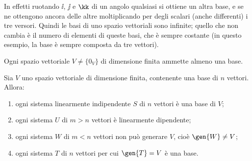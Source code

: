 In effetti ruotando $\ii$, $\jj$ e $\kk$ di un angolo qualsiasi si ottiene un altra base, e se ne ottengono ancora delle altre moltiplicando per degli scalari (anche differenti) i tre versori.
Quindi le basi di uno spazio vettoriali sono infinite; quello che non cambia è il numero di elementi di queste basi, che è sempre costante (in questo esempio, la base è sempre composta da tre vettori).
\begin{corollario}
	Ogni spazio vettoriale $V\neq\{0_V\}$ di dimensione finita ammette almeno una base.
\end{corollario}
\begin{teorema} \label{t:base-dimensione}
	Sia $V$ uno spazio vettoriale di dimensione finita, contenente una base di $n$ vettori.
	Allora:
	\begin{enumerate}
		\item ogni sistema linearmente indipendente $S$ di $n$ vettori è una base di $V$;
		\item ogni sistema $U$ di $m>n$ vettori è linearmente dipendente;
		\item ogni sistema $W$ di $m<n$ vettori non può generare $V$, cioè $\gen{W}\neq V$;
		\item ogni sistema $T$ di $n$ vettori per cui $\gen{T}=V$ è una base.
	\end{enumerate}
\end{teorema}
